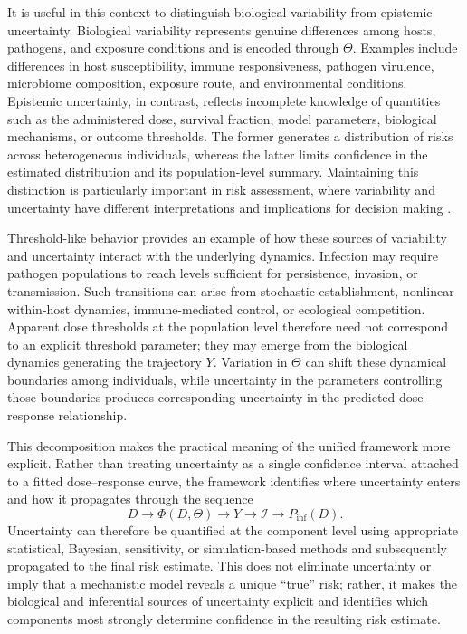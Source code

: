 \documentclass[11pt]{article}
\begin{document}
It is useful in this context to distinguish biological variability from
epistemic uncertainty. Biological variability represents genuine
differences among hosts, pathogens, and exposure conditions and is encoded
through $\Theta$. Examples include differences in host susceptibility,
immune responsiveness, pathogen virulence, microbiome composition,
exposure route, and environmental conditions. Epistemic uncertainty,
in contrast, reflects incomplete knowledge of quantities such as the
administered dose, survival fraction, model parameters, biological
mechanisms, or outcome thresholds. The former generates a distribution
of risks across heterogeneous individuals, whereas the latter limits
confidence in the estimated distribution and its population-level
summary. Maintaining this distinction is particularly important in risk
assessment, where variability and uncertainty have different
interpretations and implications for decision making
\cite{Pouillot2010,Pouillot2003Uncertainty}.

Threshold-like behavior provides an example of how these sources of
variability and uncertainty interact with the underlying dynamics.
Infection may require pathogen populations to reach levels sufficient
for persistence, invasion, or transmission. Such transitions can arise
from stochastic establishment, nonlinear within-host dynamics,
immune-mediated control, or ecological competition. Apparent dose
thresholds at the population level therefore need not correspond to an
explicit threshold parameter; they may emerge from the biological
dynamics generating the trajectory $Y$. Variation in $\Theta$ can shift
these dynamical boundaries among individuals, while uncertainty in the
parameters controlling those boundaries produces corresponding
uncertainty in the predicted dose--response relationship.

This decomposition makes the practical meaning of the unified framework
more explicit. Rather than treating uncertainty as a single confidence
interval attached to a fitted dose--response curve, the framework
identifies where uncertainty enters and how it propagates through the
sequence
\[
D
\longrightarrow
\Phi(D,\Theta)
\longrightarrow
Y
\longrightarrow
\mathcal{I}
\longrightarrow
P_{\mathrm{inf}}(D).
\]
Uncertainty can therefore be quantified at the component level using
appropriate statistical, Bayesian, sensitivity, or simulation-based
methods and subsequently propagated to the final risk estimate. This
does not eliminate uncertainty or imply that a mechanistic model reveals
a unique ``true'' risk; rather, it makes the biological and inferential
sources of uncertainty explicit and identifies which components most
strongly determine confidence in the resulting risk estimate.
\end{document}
